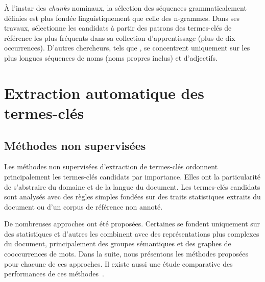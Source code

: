     À l'instar des \textit{chunks} nominaux, la sélection des séquences
    grammaticalement définies est plus fondée linguistiquement que celle des
    n-grammes. Dans ses travaux, 
    sélectionne les candidats à partir des patrons des termes-clés de référence
    les plus fréquents dans sa collection d'apprentissage (plus de dix
    occurrences). D'autres chercheurs, tels que , se
    concentrent uniquement sur les plus longues séquences de noms (noms propres
    inclus) et d'adjectifs.

    \begin{example}
    \end{example}



  \section{Extraction automatique des termes-clés}
  \label{sec:main-state_of_the_art-automatic_keyphrase_extraction}

    \subsection{Méthodes non supervisées}
    \label{subsec:main-state_of_the_art-automatic_keyphrase_extraction-unsupervised_keyphrase_extraction}
      Les méthodes non supervisées d'extraction de termes-clés ordonnent
      principalement les termes-clés candidats par importance. Elles ont la
      particularité de s'abstraire du domaine et de la langue du document. Les
      termes-clés candidats sont analysés avec des règles simples fondées sur
      des traits statistiques extraits du document ou d'un corpus de référence
      non annoté.

      De nombreuses approches ont été proposées. Certaines se fondent uniquement
      sur des statistiques et d'autres les combinent avec des représentations
      plus complexes du document, principalement des groupes sémantiques et des
      graphes de cooccurrences de mots. Dans la suite, nous présentons les
      méthodes proposées pour chacune de ces approches. Il existe aussi une
      étude comparative des performances de ces
      méthodes~\cite{hassan2010conundrums}.

